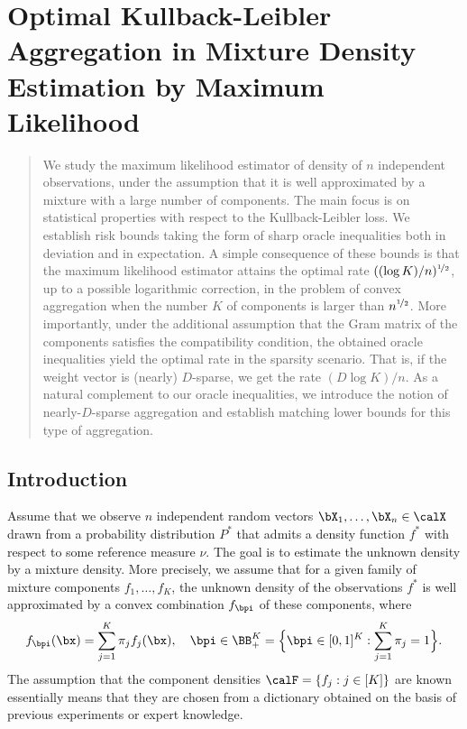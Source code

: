 

\chapter{Optimal Kullback-Leibler Aggregation in Mixture Density Estimation by Maximum Likelihood}

\begin{abstract}
We study the maximum likelihood estimator of density of $n$ independent observations, 
under the assumption that it is well approximated by a mixture with a large number of 
components. The main focus is on statistical properties with respect to the 
Kullback-Leibler loss. We establish risk bounds taking the form of sharp oracle inequalities
both in deviation and in expectation. A simple consequence of these bounds is that the 
maximum likelihood estimator attains the optimal rate $((\log K)/n)^{\nicefrac12}$, up to a 
possible logarithmic correction, in the problem of convex aggregation when the number 
$K$ of components is larger than $n^{\nicefrac12}$. More importantly, under the additional 
assumption that the Gram matrix of the components satisfies the compatibility condition, 
the obtained oracle inequalities yield the optimal rate in the sparsity scenario. That 
is, if the weight vector is (nearly) $D$-sparse, we get the rate $(D\log K)/n$. As a
natural complement to our oracle inequalities, we introduce the notion of nearly-$D$-sparse
aggregation and establish matching lower bounds for this type of aggregation. 
\end{abstract}


\section{Introduction}
Assume that we observe $n$ independent random vectors $\bX_1,\ldots,\bX_n\in\calX$ drawn from a probability distribution $P^*$
that admits a density function $f^*$ with respect to some reference measure $\nu$.
The goal is to estimate the unknown density by a mixture density. More precisely, we assume that for a given family of mixture
components $f_1,\ldots,f_K$, the unknown density of the observations $f^*$ is well approximated by a convex combination
$f_{\bpi}$ of these components, where
\begin{equation}
f_{\bpi}(\bx)=\sum_{j=1}^K\pi_j f_j(\bx), \quad \bpi \in \BB_+^K=\Big\{\bpi\in [0,1]^K: \sum_{j=1}^K\pi_j=1\Big\}.
\end{equation}
The assumption that the component densities $\calF=\{f_j:j\in[K]\}$ are known essentially means that they are chosen from a
dictionary obtained on the basis of previous experiments or expert knowledge.

